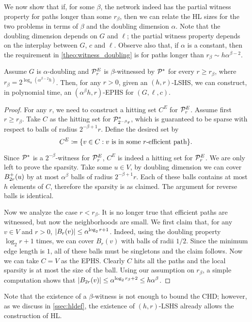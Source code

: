 We now show that if, for some $\beta$, the network indeed has the partial witness property for paths longer than some $r_\beta$, then we can relate the HL sizes for the two problems in terms of $\beta$ and the doubling dimension $\alpha$. 
Note that the doubling dimension depends on $G$ and $\ell$; the partial witness property depends on the interplay between $G$, $c$ and $\ell$.
Observe also that, if $\alpha$ is a constant, then the requirement in \cref{theo:witness_doubling} is for paths longer than $r_\beta\sim h\alpha^{\beta-2}$.
\begin{theorem}\label{theo:witness_doubling}
	Assume $G$ is $\alpha$-doubling and $\mathcal{P}^E_r$ is $\beta$-witnessed by $\mathcal{P}^*$ for every $r\geq r_\beta$, where $r_\beta=2^{\log_\alpha(\alpha^{\beta-2} h)}$. 
	Then, for any $r>0$, given an $(h,r)$-LSHS, we can construct, in polynomial time, an $(\alpha^{\beta} h,r)$-EPHS for $(G,\ell,c)$. 
\end{theorem}

\begin{proof}
	For any $r$, we need to construct a hitting set $C^E$ for $\mathcal{P}^E_r$.
	Assume first $r\geq r_\beta$.
	Take $C$ as the hitting set for $\mathcal{P}^*_{2^{-\beta}r}$, which is guaranteed to be sparse with respect to balls of radius $2^{-\beta+1}r$.
	Define the desired set by
	\[
	C^E\coloneqq\{v\in C: v \text{ is in some $r$-efficient path} \}.
	\]
	
	Since $\mathcal{P}^*$ is a $2^{-\beta}$-witness for $\mathcal{P}^E_r$, $C^E$ is indeed a hitting set for $\mathcal{P}^E_r$.
	We are only left to prove the sparsity.
	Take some $u\in V$, by doubling dimension we can cover $B^+_{2r}(u)$ by at most $\alpha^\beta$ balls of radius $2^{-\beta+1}r$.
	Each of these balls contains at most $h$ elements of $C$, therefore the sparsity is as claimed.
	The argument for reverse balls is identical.
	
	Now we analyze the case $r< r_\beta$.
	It is no longer true that efficient paths are witnessed, but now the neighborhoods are small.
	We first claim that, for any $v\in V$ and $r>0$, $\lvert B_{r}(v)\rvert\leq \alpha^{\log_2r+1}$.
	Indeed, using the doubling property $\log_2r+1$ times, we can cover $B_r(v)$ with balls of radii $1/2$.
	Since the minimum edge length is $1$, all of these balls must be singletons and the claim follows.
	Now we can take $C=V$ as the EPHS.
	Clearly $C$ hits all the paths and the local sparsity is at most the size of the ball.
	Using our assumption on $r_\beta$, a simple computation shows that $\lvert B_{2r}(v)\rvert\leq \alpha^{\log_2r_\beta+2}\leq h\alpha^\beta$. 
\end{proof}
Note that the existence of a $\beta$-witness is not enough to bound the CHD; however, as we discuss in \cref{ssec:hldef}, the existence of $(h,r)$-LSHS already allows the construction of HL. 
